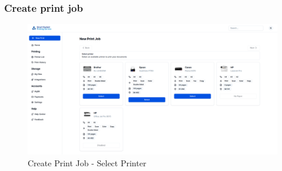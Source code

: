 \subsubsection{Create print job}

\begin{figure}[H]
    \centering
    \includegraphics[max width = 0.9\linewidth,origin = c]{chapters/8. Implementation - Sprint 2/2. Create print job.png}
    \caption{Create Print Job - Select Printer}%
\end{figure}


